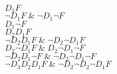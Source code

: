 \documentclass{article}
\begin{document}
    \noindent
    $D_1F$ \bigskip \\
    $\neg D_1F \; \& \; \neg D_1 \neg F$ \bigskip \\
    $D_1\neg F$ \bigskip \\
    $D_2D_1F$ \bigskip \\
    $\neg D_2 D_1 F \; \& \; \neg D_2 \neg D_1 F$ \bigskip \\
    $D_2 \neg D_1 F \; \& \; D_2 \neg D_1 \neg F$ \bigskip \\
    $\neg D_2 D_1 \neg F \; \& \; \neg D_2 \neg D_1 \neg F$ \bigskip \\
    $\neg D_3 D_2 D_1 F \; \& \; \neg D_2 \neg D_2 \neg D_1 F$ \\
\end{document}
